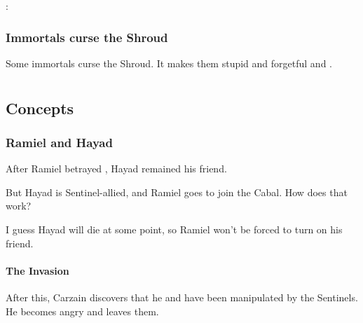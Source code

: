 \begin{garbage}
\Ishnaruchaefir: 







\subsection{Immortals curse the Shroud}
Some immortals curse the Shroud. 
It makes them stupid and forgetful and . 






















\chapter{\RamielsAwakeningBook}
\section{Concepts}
\subsection{Ramiel and Hayad}
After Ramiel betrayed \Belzir, Hayad remained his friend. 

But Hayad is Sentinel-allied, and Ramiel goes to join the Cabal. 
How does that work? 

I guess Hayad will die at some point, so Ramiel won't be forced to turn on his friend. 







\subsubsection{The \Bane{} Invasion}

After this, Carzain discovers that he and \Belzir{} have been manipulated by the Sentinels. He becomes angry and leaves them. 


\end{garbage}
